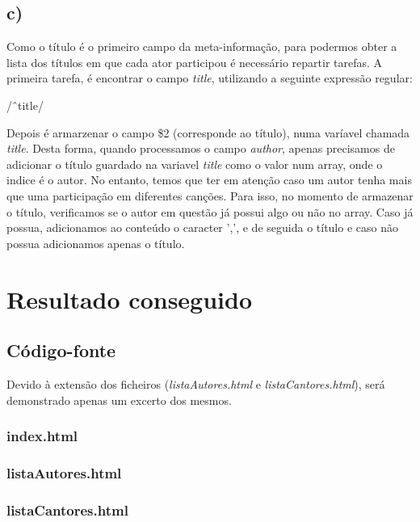 \documentclass[12pt,a4paper]{report}
\begin{document}
\subsection{c)}
Como o título é o primeiro campo da meta-informação, para podermos obter a lista dos títulos em que cada ator participou é necessário repartir tarefas. A primeira tarefa, é encontrar o campo \emph{title}, utilizando a seguinte expressão regular: \par

\begin{center}
\vspace{0.3cm}
/\^\ title/ \par
\vspace{0.3cm}
\end{center}

Depois é armarzenar o campo \$2 (corresponde ao título), numa varíavel chamada \emph{title}. Desta forma, quando processamos o campo \emph{author}, apenas precisamos de adicionar o título guardado na variavel \emph{title} como o valor num array, onde o indice é o autor. No entanto, temos que ter em atenção caso um autor tenha mais que uma participação em diferentes canções. Para isso, no momento de armazenar o título, verificamos se o autor em questão já possui algo ou não no array. Caso já possua, adicionamos ao conteúdo o caracter ',', e de seguida o título e caso não possua adicionamos apenas o título.

\section{Resultado conseguido}
\subsection{Código-fonte}
Devido à extensão dos ficheiros (\emph{listaAutores.html} e \emph{listaCantores.html}), será demonstrado apenas um excerto dos mesmos.

\subsubsection{index.html}

\vspace{0.5cm}
\subsubsection{listaAutores.html}

\vspace{0.5cm}
\subsubsection{listaCantores.html}

\vspace{0.5cm}
\end{document}
